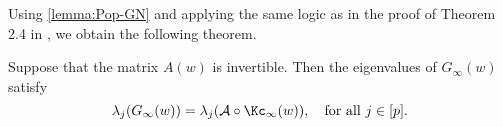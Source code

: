 Using \cref{lemma:Pop-GN} and applying the same logic as in the proof of Theorem 2.4 in \citet{de2023operator},
we obtain the following theorem. 
\begin{theorem}
\label{thm:pop-gn-eigvals}
    Suppose that the matrix $A(w)$ is invertible.
    Then the eigenvalues of $G_{\infty}(w)$ satisfy
    \[
    \lambda_j(G_\infty(w)) = \lambda_j(\mathcal A\circ \Kc_\infty(w)),\quad \text{for all}~j\in[p].
    \]
\end{theorem}


